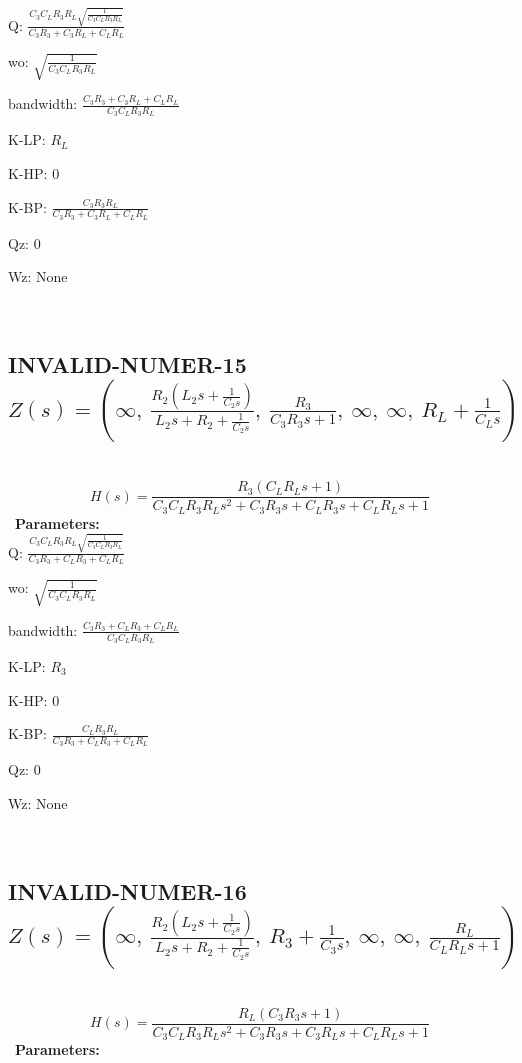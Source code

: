 \documentclass{article}
\begin{document}
Q: $\frac{C_{3} C_{L} R_{3} R_{L} \sqrt{\frac{1}{C_{3} C_{L} R_{3} R_{L}}}}{C_{3} R_{3} + C_{3} R_{L} + C_{L} R_{L}}$\ 

wo: $\sqrt{\frac{1}{C_{3} C_{L} R_{3} R_{L}}}$\ 

bandwidth: $\frac{C_{3} R_{3} + C_{3} R_{L} + C_{L} R_{L}}{C_{3} C_{L} R_{3} R_{L}}$\ 

K-LP: $R_{L}$\ 

K-HP: $0$\ 

K-BP: $\frac{C_{3} R_{3} R_{L}}{C_{3} R_{3} + C_{3} R_{L} + C_{L} R_{L}}$\ 

Qz: $0$\ 

Wz: $\text{None}$\ 

\ 

\subsection{INVALID-NUMER-15 $Z(s) = \left( \infty, \  \frac{R_{2} \left(L_{2} s + \frac{1}{C_{2} s}\right)}{L_{2} s + R_{2} + \frac{1}{C_{2} s}}, \  \frac{R_{3}}{C_{3} R_{3} s + 1}, \  \infty, \  \infty, \  R_{L} + \frac{1}{C_{L} s}\right)$ } \ 
\textbf{\[H(s) = \frac{R_{3} \left(C_{L} R_{L} s + 1\right)}{C_{3} C_{L} R_{3} R_{L} s^{2} + C_{3} R_{3} s + C_{L} R_{3} s + C_{L} R_{L} s + 1}\] } \ 
\textbf{Parameters:}\\ 

Q: $\frac{C_{3} C_{L} R_{3} R_{L} \sqrt{\frac{1}{C_{3} C_{L} R_{3} R_{L}}}}{C_{3} R_{3} + C_{L} R_{3} + C_{L} R_{L}}$\ 

wo: $\sqrt{\frac{1}{C_{3} C_{L} R_{3} R_{L}}}$\ 

bandwidth: $\frac{C_{3} R_{3} + C_{L} R_{3} + C_{L} R_{L}}{C_{3} C_{L} R_{3} R_{L}}$\ 

K-LP: $R_{3}$\ 

K-HP: $0$\ 

K-BP: $\frac{C_{L} R_{3} R_{L}}{C_{3} R_{3} + C_{L} R_{3} + C_{L} R_{L}}$\ 

Qz: $0$\ 

Wz: $\text{None}$\ 

\ 

\subsection{INVALID-NUMER-16 $Z(s) = \left( \infty, \  \frac{R_{2} \left(L_{2} s + \frac{1}{C_{2} s}\right)}{L_{2} s + R_{2} + \frac{1}{C_{2} s}}, \  R_{3} + \frac{1}{C_{3} s}, \  \infty, \  \infty, \  \frac{R_{L}}{C_{L} R_{L} s + 1}\right)$ } \ 
\textbf{\[H(s) = \frac{R_{L} \left(C_{3} R_{3} s + 1\right)}{C_{3} C_{L} R_{3} R_{L} s^{2} + C_{3} R_{3} s + C_{3} R_{L} s + C_{L} R_{L} s + 1}\] } \ 
\textbf{Parameters:}\\ 
\end{document}

